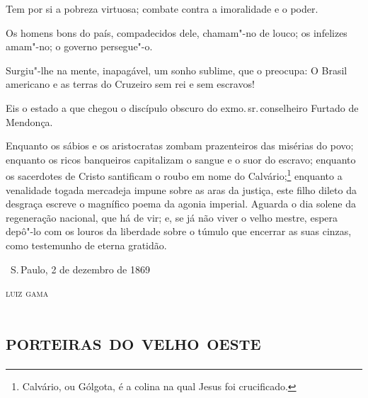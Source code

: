 Tem por si a pobreza virtuosa; combate contra a imoralidade e o poder.

Os homens bons do país, compadecidos dele, chamam"-no de louco; os
infelizes amam"-no; o governo persegue"-o.

Surgiu"-lhe na mente, inapagável, um sonho sublime, que o preocupa: O
Brasil americano e as terras do Cruzeiro sem rei e sem escravos!

Eis o estado a que chegou o discípulo obscuro do exmo.\,sr.\,conselheiro
Furtado de Mendonça.

Enquanto os sábios e os aristocratas zombam prazenteiros das misérias do
povo; enquanto os ricos banqueiros capitalizam o sangue e o suor do
escravo; enquanto os sacerdotes de Cristo santificam o roubo em nome do
Calvário;\footnote{Calvário, ou Gólgota, é a colina na qual Jesus foi
  crucificado.} enquanto a
venalidade togada mercadeja impune sobre as aras da justiça, este filho
dileto da desgraça escreve o magnífico poema da agonia imperial. Aguarda
o dia solene da regeneração nacional, que há de vir; e, se já não viver
o velho mestre, espera depô"-lo com os louros da liberdade sobre o túmulo
que encerrar as suas cinzas, como testemunho de eterna gratidão.

\vfill

\hfill\ S.\,Paulo, 2 de dezembro de 1869\smallskip

\hfill\textsc{luiz gama}

\begingroup\makeatletter\@openrightfalse
\part{\textsc{porteiras do velho oeste}}

\pagebreak
\thispagestyle{empty}


